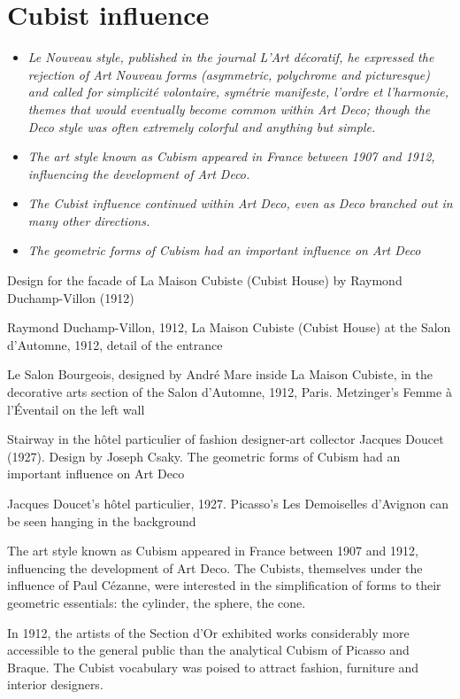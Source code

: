 \section{Cubist influence}\label{cubist-influence}

\begin{itemize}
\item
  \emph{Le Nouveau style, published in the journal L'Art décoratif, he
  expressed the rejection of Art Nouveau forms (asymmetric, polychrome
  and picturesque) and called for simplicité volontaire, symétrie
  manifeste, l'ordre et l'harmonie, themes that would eventually become
  common within Art Deco; though the Deco style was often extremely
  colorful and anything but simple.}
\item
  \emph{The art style known as Cubism appeared in France between 1907
  and 1912, influencing the development of Art Deco.}
\item
  \emph{The Cubist influence continued within Art Deco, even as Deco
  branched out in many other directions.}
\item
  \emph{The geometric forms of Cubism had an important influence on Art
  Deco}
\end{itemize}

Design for the facade of La Maison Cubiste (Cubist House) by Raymond
Duchamp-Villon (1912)

Raymond Duchamp-Villon, 1912, La Maison Cubiste (Cubist House) at the
Salon d'Automne, 1912, detail of the entrance

Le Salon Bourgeois, designed by André Mare inside La Maison Cubiste, in
the decorative arts section of the Salon d'Automne, 1912, Paris.
Metzinger's Femme à l'Éventail on the left wall

Stairway in the hôtel particulier of fashion designer-art collector
Jacques Doucet (1927). Design by Joseph Csaky. The geometric forms of
Cubism had an important influence on Art Deco

Jacques Doucet's hôtel particulier, 1927. Picasso's Les Demoiselles
d'Avignon can be seen hanging in the background

The art style known as Cubism appeared in France between 1907 and 1912,
influencing the development of Art Deco. The Cubists, themselves under
the influence of Paul Cézanne, were interested in the simplification of
forms to their geometric essentials: the cylinder, the sphere, the cone.

In 1912, the artists of the Section d'Or exhibited works considerably
more accessible to the general public than the analytical Cubism of
Picasso and Braque. The Cubist vocabulary was poised to attract fashion,
furniture and interior designers.


